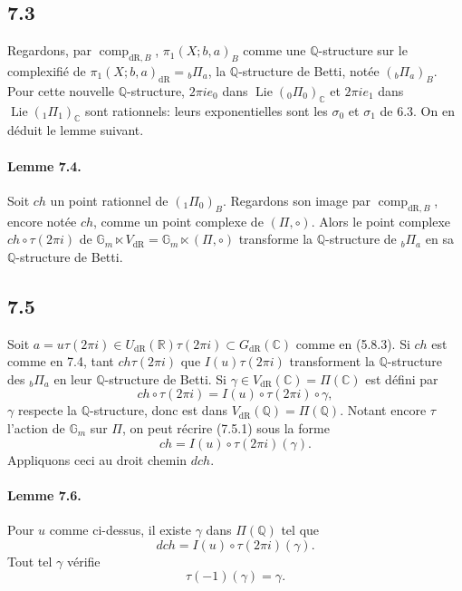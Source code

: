 \documentclass[10pt]{article}
\newcommand{\Q}{\mathbb Q}
\newcommand{\R}{\mathbb R}
\newcommand{\C}{\mathbb C}
\newcommand{\Gm}{\mathbb G_m}
\newcommand{\Lie}{\operatorname{Lie}}
\newcommand{\comp}{\operatorname{comp}}
\newcommand{\dR}{\mathrm{dR}}
\begin{document}
\subsection*{7.3}
Regardons, par $\comp_{\dR,B}$, $\pi_1(X;b,a)_B$ comme une $\Q$-structure sur le complexifié de $\pi_1(X;b,a)_{\dR}={}_b\Pi_a$, la $\Q$-structure de Betti, notée $({}_b\Pi_a)_B$. Pour cette nouvelle $\Q$-structure, $2\pi i e_0$ dans $\Lie({}_0\Pi_0)_\C$ et $2\pi i e_1$ dans $\Lie({}_1\Pi_1)_\C$ sont rationnels: leurs exponentielles sont les $\sigma_0$ et $\sigma_1$ de 6.3. On en déduit le lemme suivant.

\paragraph{Lemme 7.4.}
Soit $ch$ un point rationnel de $({}_1\Pi_0)_B$. Regardons son image par $\comp_{\dR,B}$, encore notée $ch$, comme un point complexe de $(\Pi,\circ)$. Alors le point complexe $ch\circ\tau(2\pi i)$ de $\Gm\ltimes V_{\dR}=\Gm\ltimes(\Pi,\circ)$ transforme la $\Q$-structure de ${}_b\Pi_a$ en sa $\Q$-structure de Betti.

\subsection*{7.5}
Soit $a=u\tau(2\pi i)\in U_{\dR}(\R)\tau(2\pi i)\subset G_{\dR}(\C)$ comme en (5.8.3). Si $ch$ est comme en 7.4, tant $ch\tau(2\pi i)$ que $I(u)\tau(2\pi i)$ transforment la $\Q$-structure des ${}_b\Pi_a$ en leur $\Q$-structure de Betti. Si $\gamma\in V_{\dR}(\C)=\Pi(\C)$ est défini par
\begin{equation}
ch\circ\tau(2\pi i)=I(u)\circ\tau(2\pi i)\circ\gamma,
\tag{7.5.1}
\end{equation}
$\gamma$ respecte la $\Q$-structure, donc est dans $V_{\dR}(\Q)=\Pi(\Q)$. Notant encore $\tau$ l'action de $\Gm$ sur $\Pi$, on peut récrire (7.5.1) sous la forme
\[
ch=I(u)\circ\tau(2\pi i)(\gamma).
\]
Appliquons ceci au droit chemin $dch$.

\paragraph{Lemme 7.6.}
Pour $u$ comme ci-dessus, il existe $\gamma$ dans $\Pi(\Q)$ tel que
\begin{equation}
dch=I(u)\circ\tau(2\pi i)(\gamma).
\tag{7.6.1}
\end{equation}
Tout tel $\gamma$ vérifie
\begin{equation}
\tau(-1)(\gamma)=\gamma.
\tag{7.6.2}
\end{equation}
\end{document}
